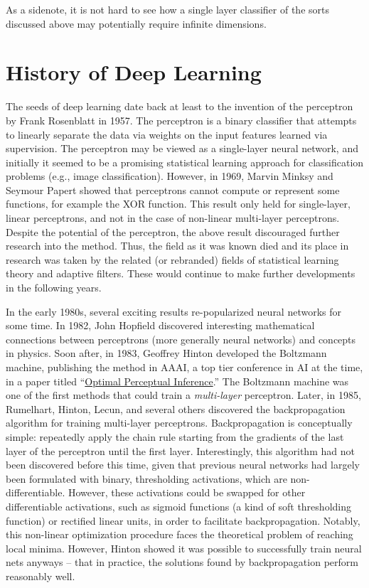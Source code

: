 As a sidenote, it is not hard to see how a single layer classifier of the sorts discussed above may potentially require infinite dimensions.

\section{History of Deep Learning}\label{ssec:history}

The seeds of deep learning date back at least to the invention of the perceptron by Frank Rosenblatt in 1957.
The perceptron is a binary classifier that attempts to linearly separate the data via weights on the input features learned via supervision.
The perceptron may be viewed as a single-layer neural network, and initially it seemed to be a promising statistical learning approach for classification problems (e.g., image classification).
However, in 1969, Marvin Minksy and Seymour Papert showed that perceptrons cannot compute or represent some functions, for example the XOR function.
This result only held for single-layer, linear perceptrons, and not in the case of non-linear multi-layer perceptrons.
Despite the potential of the perceptron, the above result discouraged further research into the method.
Thus, the field as it was known died and its place in research was taken by the related (or rebranded) fields of statistical learning theory and adaptive filters.
These would continue to make further developments in the following years.

In the early 1980s, several exciting results re-popularized neural networks for some time.
In 1982, John Hopfield discovered interesting mathematical connections between perceptrons (more generally neural networks) and concepts in physics.
Soon after, in 1983, Geoffrey Hinton developed the Boltzmann machine, publishing the method in AAAI, a top tier conference in AI at the time, in a paper titled ``\href{https://papers.cnl.salk.edu/PDFs/Optimal\%20Perceptual\%20Inference\%201983-646.pdf}{Optimal Perceptual Inference}.''
The Boltzmann machine was one of the first methods that could train a \textit{multi-layer} perceptron.
Later, in 1985, Rumelhart, Hinton, Lecun, and several others discovered the backpropagation algorithm for training multi-layer perceptrons.
Backpropagation is conceptually simple: repeatedly apply the chain rule starting from the gradients of the last layer of the perceptron until the first layer.
Interestingly, this algorithm had not been discovered before this time, given that previous neural networks had largely been formulated with binary, thresholding activations, which are non-differentiable.
However, these activations could be swapped for other differentiable activations, such as sigmoid functions (a kind of soft thresholding function) or rectified linear units, in order to facilitate backpropagation.
Notably, this non-linear optimization procedure faces the theoretical problem of reaching local minima.
However, Hinton showed it was possible to successfully train neural nets anyways -- that in practice, the solutions found by backpropagation perform reasonably well.

